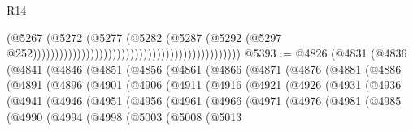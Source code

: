 \begin{lexlean}{R14}
\begin{coremodule}
                                                                                    (@5267
                                                                                      (@5272
                                                                                        (@5277
                                                                                          (@5282
                                                                                            (@5287
                                                                                              (@5292
                                                                                                (@5297
                                                                                                  @252)))))))))))))))))))))))))))))))))))))))))))))))
@5393 := @4826
    (@4831
      (@4836
        (@4841
          (@4846
            (@4851
              (@4856
                (@4861
                  (@4866
                    (@4871
                      (@4876
                        (@4881
                          (@4886
                            (@4891
                              (@4896
                                (@4901
                                  (@4906
                                    (@4911
                                      (@4916
                                        (@4921
                                          (@4926
                                            (@4931
                                              (@4936
                                                (@4941
                                                  (@4946
                                                    (@4951
                                                      (@4956
                                                        (@4961
                                                          (@4966
                                                            (@4971
                                                              (@4976
                                                                (@4981
                                                                  (@4985
                                                                    (@4990
                                                                      (@4994
                                                                        (@4998
                                                                          (@5003
                                                                            (@5008
                                                                              (@5013

\end{coremodule}
\end{lexlean}
